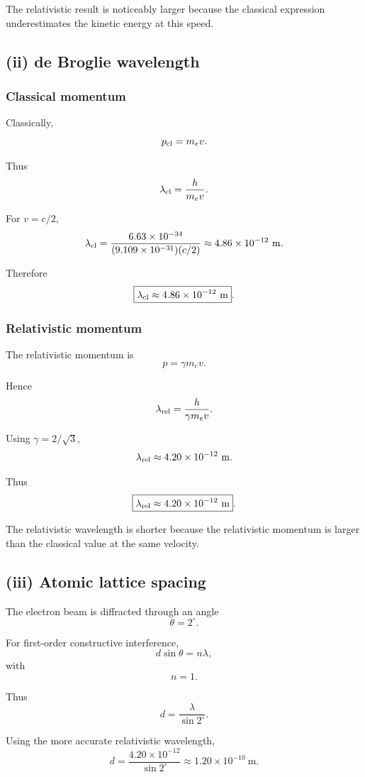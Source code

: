 \documentclass[11pt,a4paper]{article}
\begin{document}
The relativistic result is noticeably larger because the classical expression
underestimates the kinetic energy at this speed.

\subsection{(ii) de Broglie wavelength}

\subsubsection*{Classical momentum}

Classically,
\[
p_{\rm cl}=m_ev.
\]

Thus
\[
\lambda_{\rm cl}
=
\frac{h}{m_ev}.
\]

For $v=c/2$,
\[
\lambda_{\rm cl}
=
\frac{6.63\times10^{-34}}
{(9.109\times10^{-31})(c/2)}
\approx4.86\times10^{-12}\ \mathrm m.
\]

Therefore
\[
\boxed{\lambda_{\rm cl}\approx4.86\times10^{-12}\ \mathrm m}.
\]

\subsubsection*{Relativistic momentum}

The relativistic momentum is
\[
p=\gamma m_ev.
\]

Hence
\[
\lambda_{\rm rel}
=
\frac{h}{\gamma m_ev}.
\]

Using $\gamma=2/\sqrt3$,
\[
\lambda_{\rm rel}
\approx4.20\times10^{-12}\ \mathrm m.
\]

Thus
\[
\boxed{\lambda_{\rm rel}\approx4.20\times10^{-12}\ \mathrm m}.
\]

The relativistic wavelength is shorter because the relativistic momentum is larger
than the classical value at the same velocity.

\subsection{(iii) Atomic lattice spacing}

The electron beam is diffracted through an angle
\[
\theta=2^\circ.
\]

For first-order constructive interference,
\[
d\sin\theta=n\lambda,
\]
with
\[
n=1.
\]

Thus
\[
d=\frac{\lambda}{\sin2^\circ}.
\]

Using the more accurate relativistic wavelength,
\[
d
=
\frac{4.20\times10^{-12}}{\sin2^\circ}
\approx1.20\times10^{-10}\ \mathrm m.
\]
\end{document}
